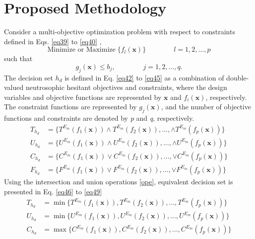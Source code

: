 \documentclass[a4paper]{elsarticle}
\begin{document}
{\section{Proposed Methodology}
\noindent Consider a multi-objective optimization problem with respect to constraints defined in Eqs. \ref{eq39} to \ref{eq40} ,
\begin{equation}
\label{eq39}
\text{Minimize or Maximize} \; \{f_l(\mathbf{x})\} \qquad \qquad l=1,2,\ldots,p
\end{equation}
such that
\begin{equation}
\label{eq40}
g_j(\mathbf{x}) \leq b_j, \qquad\qquad j=1,2,\ldots, q.
\end{equation}
The decision set $h_{d}$ is defined in Eq. \ref{eq42} to \ref{eq45}  as a combination of double-valued neutrosophic hesitant objectives and constraints, where the design variables and objective functions are represented by $\mathbf{x}$ and ${f}_i(\mathbf{x})$, respectively. The constraint functions are represented by ${g}_j(\mathbf{x})$, and the number of objective functions and constraints are denoted by \textit{p} and \textit{q}, respectively.
\begin{align}
\label{eq42}
T_{h_{d}} &= \{ T^{E_m}(f_1(\mathbf{x})) \wedge T^{E_m}(f_2(\mathbf{x})), \ldots, \wedge T^{E_m}(f_p(\mathbf{x})) \} \\
U_{h_{d}} &= \{ U^{E_m}(f_1(\mathbf{x})) \wedge U^{E_m}(f_2(\mathbf{x})), \ldots, \wedge U^{E_m}(f_p(\mathbf{x})) \} \\
C_{h_{d}} &= \{ C^{E_m}(f_1(\mathbf{x})) \vee C^{E_m}(f_2(\mathbf{x})), \ldots, \vee C^{E_m}(f_p(\mathbf{x})) \} \\
\label{eq45}
F_{h_{d}} &= \{ F^{E_m}(f_1(\mathbf{x})) \vee F^{E_m}(f_2(\mathbf{x})), \ldots, \vee F^{E_m}(f_p(\mathbf{x})) \}
\end{align}
Using the intersection and union operations \ref{ope}, equivalent decision set is presented in Eq. \ref{eq46} to \ref{eq49}
\begin{align}
\label{eq46}
T_{h_{d}} &= \min\{ T^{E_m}(f_1(\mathbf{x})), T^{E_m}(f_2(\mathbf{x})), \ldots, T^{E_m}(f_p(\mathbf{x})) \} \\
U_{h_{d}} &= \min\{ U^{E_m}(f_1(\mathbf{x})), U^{E_m}(f_2(\mathbf{x})), \ldots, U^{E_m}(f_p(\mathbf{x})) \} \\
C_{h_{d}} &= \max\{ C^{E_m}(f_1(\mathbf{x})), C^{E_m}(f_2(\mathbf{x})), \ldots, C^{E_m}(f_p(\mathbf{x})) \}\\

\end{align}}
\end{document}
